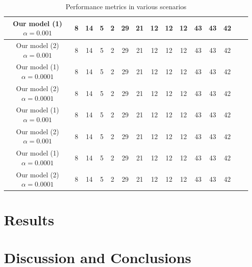 \documentclass{article} %
\begin{document}
\begin{table}
{\begin{tabular}{|c|c|c|c|c|c|c|c|c|c|c|c|c|c|c|}
    \hline
            Our model (1) $\alpha =0.001$ &8&14&5&2&29&21&12&12&12&43&43&42\\
    \hline
            Our model (2)  $\alpha =0.001$&8&14&5&2&29&21&12&12&12&43&43&42\\
    \hline
            Our model (1)   $\alpha =0.0001$&8&14&5&2&29&21&12&12&12&43&43&42\\
    \hline
            Our model (2)    $\alpha =0.0001$&8&14&5&2&29&21&12&12&12&43&43&42\\
    \hline
            Our model (1) $\alpha =0.001$ &8&14&5&2&29&21&12&12&12&43&43&42\\
    \hline
            Our model (2)  $\alpha =0.001$&8&14&5&2&29&21&12&12&12&43&43&42\\
    \hline
            Our model (1)   $\alpha =0.0001$&8&14&5&2&29&21&12&12&12&43&43&42\\
    \hline
            Our model (2)    $\alpha =0.0001$&8&14&5&2&29&21&12&12&12&43&43&42\\
    \hline
  \end{tabular}
  }
  \caption{Performance metrics in various scenarios}
  \label{tab:hyperparam}
\end{table}

\section{Results}




\section{Discussion and Conclusions}

\label{sec:discussion}

%
%
%
%
%
%
%
\printbibliography
\end{document}
